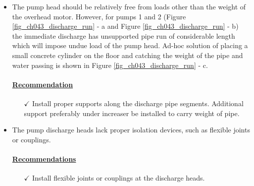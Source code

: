 \begin{itemize}
\item The pump head should be relatively free from loads other than the weight of the overhead motor. However, for pumps 1 and 2 (Figure \ref{fig_ch043_discharge_run} - a and Figure \ref{fig_ch043_discharge_run} - b) the immediate discharge has unsupported pipe run of considerable length which will impose undue load of the pump head. Ad-hoc solution of placing a small concrete cylinder on the floor and catching the weight of the pipe and water passing is shown in Figure \ref{fig_ch043_discharge_run} - c. 

\paragraph{\underline{Recommendation}}
\begin{itemize}
	\item [$\checkmark$] Install proper supports along the discharge pipe segments. Additional support preferably under increaser be installed to carry weight of pipe.%
\end{itemize}
\end{itemize}

\begin{itemize}
\item The pump discharge heads lack proper isolation devices, such as flexible joints or couplings. 

\paragraph{\underline{Recommendations}}
\begin{itemize}
	\item [$\checkmark$] Install flexible joints or couplings at the discharge heads.
\end{itemize}
\end{itemize}

